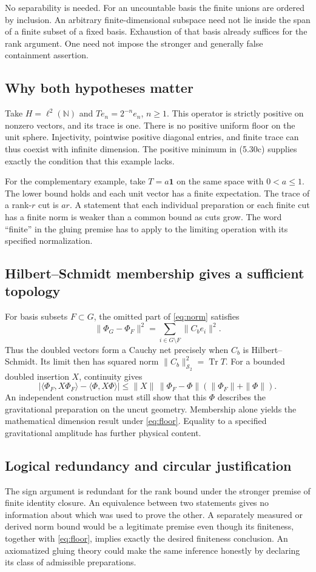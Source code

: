 \documentclass[11pt]{article}
\newcommand{\Tr}{\operatorname{Tr}}
\newcommand{\id}{\mathbf{1}}
\newcommand{\HS}{\mathcal S_2}
\begin{document}
No separability is needed. For an uncountable basis the finite unions are ordered by inclusion. An arbitrary finite-dimensional subspace need not lie inside the span of a finite subset of a fixed basis. Exhaustion of that basis already suffices for the rank argument. One need not impose the stronger and generally false containment assertion.

\subsection{Why both hypotheses matter}
Take $H=\ell^2(\mathbb N)$ and $Te_n=2^{-n}e_n$, $n\ge1$. This operator is strictly positive on nonzero vectors, and its trace is one. There is no positive uniform floor on the unit sphere. Injectivity, pointwise positive diagonal entries, and finite trace can thus coexist with infinite dimension. The positive minimum in (5.30c) supplies exactly the condition that this example lacks.

For the complementary example, take $T=a\id$ on the same space with $0<a\le1$. The lower bound holds and each unit vector has a finite expectation. The trace of a rank-$r$ cut is $ar$. A statement that each individual preparation or each finite cut has a finite norm is weaker than a common bound as cuts grow. The word ``finite'' in the gluing premise has to apply to the limiting operation with its specified normalization.

\subsection{Hilbert--Schmidt membership gives a sufficient topology}
For basis subsets $F\subset G$, the omitted part of \eqref{eq:norm} satisfies
\[
 \|\Phi_G-\Phi_F\|^2=\sum_{i\in G\setminus F}\|C_b e_i\|^2.
\]
Thus the doubled vectors form a Cauchy net precisely when $C_b$ is Hilbert--Schmidt. Its limit then has squared norm $\|C_b\|_{\HS}^2=\Tr T$. For a bounded doubled insertion $X$, continuity gives
\[
 |\langle\Phi_F,X\Phi_F\rangle-\langle\Phi,X\Phi\rangle|
 \le \|X\|\,\|\Phi_F-\Phi\|(\|\Phi_F\|+\|\Phi\|).
\]
An independent construction must still show that this $\Phi$ describes the gravitational preparation on the uncut geometry. Membership alone yields the mathematical dimension result under \eqref{eq:floor}. Equality to a specified gravitational amplitude has further physical content.

\subsection{Logical redundancy and circular justification}
The sign argument is redundant for the rank bound under the stronger premise of finite identity closure. An equivalence between two statements gives no information about which was used to prove the other. A separately measured or derived norm bound would be a legitimate premise even though its finiteness, together with \eqref{eq:floor}, implies exactly the desired finiteness conclusion. An axiomatized gluing theory could make the same inference honestly by declaring its class of admissible preparations.
\end{document}
